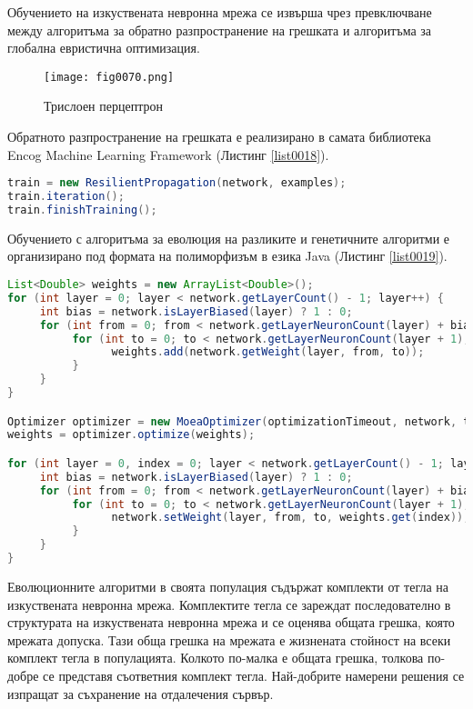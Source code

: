 Обучението на изкуствената невронна мрежа се извърша чрез превключване между алгоритъма за обратно разпространение на грешката и алгоритъма за глобална евристична оптимизация. 

\begin{figure}[H]
  \centering
  \texttt{[image: fig0070.png]}
  \caption{Трислоен перцептрон}
\label{fig0070}
\end{figure}

Обратното разпространение на грешката е реализирано в самата библиотека Encog Machine Learning Framework (Листинг \ref{list0018}).

\begin{lstlisting}[caption=Обучение с обратно разпространение на грешката, language=Java, basicstyle=\tiny, label=list0018]
train = new ResilientPropagation(network, examples);
train.iteration();
train.finishTraining();
\end{lstlisting}

Обучението с алгоритъма за еволюция на разликите и генетичните алгоритми е организирано под формата на полиморфизъм в езика Java (Листинг \ref{list0019}).

\begin{lstlisting}[caption=Обучение с еволюционни евристични алгоритми, language=Java, basicstyle=\tiny, label=list0019]
List<Double> weights = new ArrayList<Double>();
for (int layer = 0; layer < network.getLayerCount() - 1; layer++) {
	 int bias = network.isLayerBiased(layer) ? 1 : 0;
	 for (int from = 0; from < network.getLayerNeuronCount(layer) + bias; from++) {
		  for (int to = 0; to < network.getLayerNeuronCount(layer + 1); to++) {
				weights.add(network.getWeight(layer, from, to));
		  }
	 }
}

Optimizer optimizer = new MoeaOptimizer(optimizationTimeout, network, train, populationSize, crossoverRate, scalingFactor);
weights = optimizer.optimize(weights);

for (int layer = 0, index = 0; layer < network.getLayerCount() - 1; layer++) {
	 int bias = network.isLayerBiased(layer) ? 1 : 0;
	 for (int from = 0; from < network.getLayerNeuronCount(layer) + bias; from++) {
		  for (int to = 0; to < network.getLayerNeuronCount(layer + 1); to++, index++) {
				network.setWeight(layer, from, to, weights.get(index));
		  }
	 }
}
\end{lstlisting}

Еволюционните алгоритми в своята популация съдържат комплекти от тегла на изкуствената невронна мрежа. Комплектите тегла се зареждат последователно в структурата на изкуствената невронна мрежа и се оценява общата грешка, която мрежата допуска. Тази обща грешка на мрежата е жизнената стойност на всеки комплект тегла в популацията. Колкото по-малка е общата грешка, толкова по-добре се представя съответния комплект тегла. Най-добрите намерени решения се изпращат за съхранение на отдалечения сървър. 

